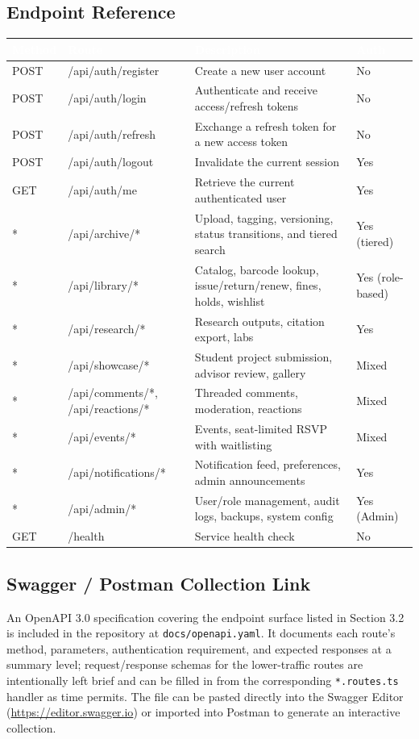 \documentclass[12pt]{article}
\begin{document}
\subsection{Endpoint Reference}
\renewcommand{\arraystretch}{1.3}
\begin{longtable}{|L{1.4cm}|L{3.4cm}|L{6.3cm}|L{2.3cm}|}
\hline
{} \textcolor{white}{\bfseries Method} & \textcolor{white}{\bfseries Route} & \textcolor{white}{\bfseries Description} & \textcolor{white}{\bfseries Auth} \\
\hline
POST & /api/auth/register & Create a new user account & No \\
\hline
POST & /api/auth/login & Authenticate and receive access/refresh tokens & No \\
\hline
POST & /api/auth/refresh & Exchange a refresh token for a new access token & No \\
\hline
POST & /api/auth/logout & Invalidate the current session & Yes \\
\hline
GET & /api/auth/me & Retrieve the current authenticated user & Yes \\
\hline
* & /api/archive/* & Upload, tagging, versioning, status transitions, and tiered search & Yes (tiered) \\
\hline
* & /api/library/* & Catalog, barcode lookup, issue/return/renew, fines, holds, wishlist & Yes (role-based) \\
\hline
* & /api/research/* & Research outputs, citation export, labs & Yes \\
\hline
* & /api/showcase/* & Student project submission, advisor review, gallery & Mixed \\
\hline
* & /api/comments/*, /api/reactions/* & Threaded comments, moderation, reactions & Mixed \\
\hline
* & /api/events/* & Events, seat-limited RSVP with waitlisting & Mixed \\
\hline
* & /api/notifications/* & Notification feed, preferences, admin announcements & Yes \\
\hline
* & /api/admin/* & User/role management, audit logs, backups, system config & Yes (Admin) \\
\hline
GET & /health & Service health check & No \\
\hline
\end{longtable}

\subsection{Swagger / Postman Collection Link}
An OpenAPI 3.0 specification covering the endpoint surface listed in Section 3.2 is included in the repository at \texttt{docs/openapi.yaml}. It documents each route's method, parameters, authentication requirement, and expected responses at a summary level; request/response schemas for the lower-traffic routes are intentionally left brief and can be filled in from the corresponding \texttt{*.routes.ts} handler as time permits. The file can be pasted directly into the Swagger Editor (\url{https://editor.swagger.io}) or imported into Postman to generate an interactive collection.
\end{document}
